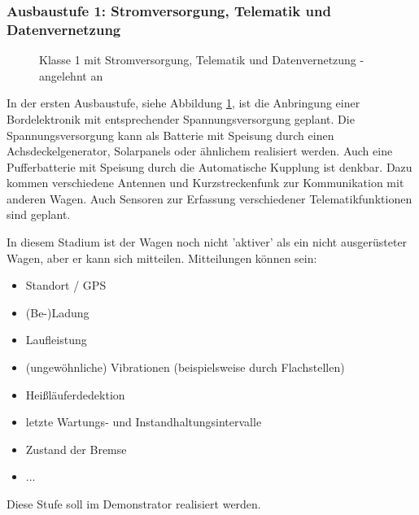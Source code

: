 \subsubsection{Ausbaustufe 1: Stromversorgung, Telematik und Datenvernetzung}
\begin{figure}[hbp] 
    
    \caption{Klasse 1 mit Stromversorgung, Telematik und Datenvernetzung - angelehnt an \cite{ETR_3} }
    \label{fig:Klasse1}
\end{figure} 
In der ersten Ausbaustufe, siehe Abbildung \ref{fig:Klasse1}, ist die Anbringung einer Bordelektronik mit  entsprechender Spannungsversorgung geplant. Die Spannungsversorgung kann als Batterie mit Speisung durch einen Achsdeckelgenerator, Solarpanels oder ähnlichem realisiert werden. Auch eine Pufferbatterie mit Speisung durch die Automatische Kupplung ist denkbar. Dazu kommen verschiedene Antennen und Kurzstreckenfunk zur Kommunikation mit anderen Wagen. Auch Sensoren zur Erfassung verschiedener Telematikfunktionen sind geplant.\par
In diesem Stadium ist der Wagen noch nicht 'aktiver' als ein nicht ausgerüsteter Wagen, aber er kann sich mitteilen. Mitteilungen können sein: 
\begin{itemize}
    \item Standort / GPS
    \item (Be-)Ladung
    \item Laufleistung
    \item (ungewöhnliche) Vibrationen (beispielsweise durch Flachstellen)
    \item Heißläuferdedektion
    \item letzte Wartungs- und Instandhaltungsintervalle
    \item Zustand der Bremse
    \item ...
\end{itemize}
Diese Stufe soll im Demonstrator realisiert werden.


